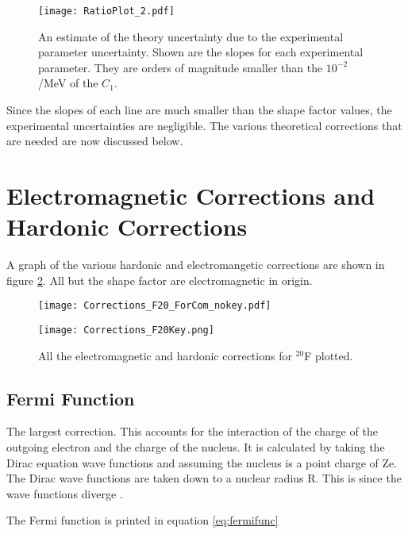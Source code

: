 \documentclass[../MaxHughesThesis.tex]{subfiles}
\begin{document}
\begin{figure}[!htb]
	\centerline{\texttt{[image: RatioPlot\_2.pdf]}}
	\caption{An estimate of the theory uncertainty due to the experimental parameter uncertainty.	
		 Shown are the slopes for each experimental parameter. 
		 They are orders of magnitude smaller than the $10^{-2}$/MeV of the $C_{1}$.}
	\label{fig:theoryuncer}
\end{figure}

Since the slopes of each line are much smaller than the shape factor values, the experimental uncertainties are negligible. 
The various theoretical corrections that are needed are now discussed below.

\section{Electromagnetic Corrections and Hardonic Corrections}
A graph of the various hardonic and electromangetic corrections are shown in figure \ref{fig:corrections}.
All but the shape factor are electromagnetic in origin. 

\begin{figure}
    \centering
    \begin{minipage}{0.65\textwidth}
        \centerline{\texttt{[image: Corrections\_F20\_ForCom\_nokey.pdf]}} %
    \end{minipage}\hfill
    \begin{minipage}{0.35\textwidth}
        \centerline{\texttt{[image: Corrections\_F20Key.png]}}
    \end{minipage}
    \caption{All the electromagnetic and hardonic corrections for $^{20}$F plotted.}
    \label{fig:corrections}
\end{figure}

\subsection{Fermi Function}

The largest correction. 
This accounts for the interaction of the charge of the outgoing electron and the charge of the nucleus.
It is calculated by taking the Dirac equation wave functions and assuming the nucleus is a point charge of Ze.
The Dirac wave functions are taken down to a nuclear radius R.
This is since the wave functions diverge \cite{Wil89}.

The Fermi function is printed in equation \ref{eq:fermifunc}
\end{document}
